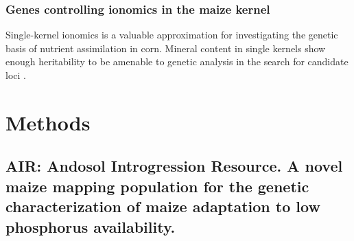 \subsubsection{Genes controlling ionomics in the maize kernel}

Single-kernel ionomics is a valuable approximation for investigating the genetic basis of nutrient  assimilation in corn.
Mineral content in single kernels show enough heritability to be amenable to genetic analysis in the search for candidate loci \citep{baxter2014,baxter2013}. 

\section{Methods}

\subsection{AIR: Andosol Introgression Resource. A novel maize mapping population for the genetic characterization of maize adaptation to low phosphorus availability.} 

